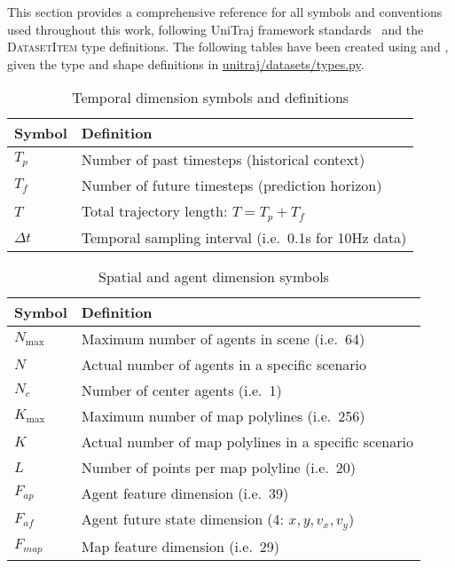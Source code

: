 This section provides a comprehensive reference for all symbols and conventions used throughout this work, following UniTraj framework standards~\cite{unitrajFeng2024} and the \textsc{DatasetItem} type definitions. The following tables have been created using \cite{githubCopilot2021} and \cite{claude35Sonnet2024}, given the type and shape definitions in \href{https://github.com/JanDuchscherer104/UniTraj/blob/main/unitraj/datasets/types.py}{unitraj/datasets/types.py}.

\begin{table}[H]
\caption{Temporal dimension symbols and definitions}
\centering
\begin{tabular}{p{3cm}p{10cm}}
\toprule
\textbf{Symbol} & \textbf{Definition} \\
\midrule
\(T_p\) & Number of past timesteps (historical context) \\
\(T_f\) & Number of future timesteps (prediction horizon) \\
\(T\) & Total trajectory length: \(T = T_p + T_f\) \\
\(\Delta t\) & Temporal sampling interval (i.e.\ 0.1s for 10Hz data) \\
\bottomrule
\end{tabular}
\end{table}

\begin{table}[H]
\caption{Spatial and agent dimension symbols}
\label{tab:shape_symbols}
\centering
\begin{tabular}{p{3cm}p{10cm}}
\toprule
\textbf{Symbol} & \textbf{Definition} \\
\midrule
\(N_{\max}\) & Maximum number of agents in scene (i.e.\ 64) \\
\(N\) & Actual number of agents in a specific scenario \\
\(N_c\) & Number of center agents (i.e.\ 1) \\
\(K_{\max}\) & Maximum number of map polylines (i.e.\ 256) \\
\(K\) & Actual number of map polylines in a specific scenario \\
\(L\) & Number of points per map polyline (i.e.\ 20) \\
\(F_{ap}\) & Agent feature dimension (i.e.\ 39) \\
\(F_{af}\) & Agent future state dimension (4: \(x, y, v_x, v_y\)) \\
\(F_{map}\) & Map feature dimension (i.e.\ 29) \\
\bottomrule
\end{tabular}
\end{table}

